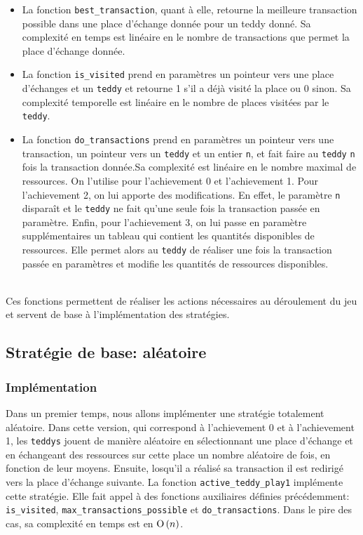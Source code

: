 \documentclass[12pt]{article}
\begin{document}
\begin{itemize}
        \item La fonction \texttt{best\_transaction}, quant à elle, retourne la meilleure transaction possible dans une place d'échange donnée pour un teddy donné. Sa complexité en temps est linéaire en le nombre de transactions que permet la place d'échange donnée.\\
        
        \item La fonction \texttt{is\_visited} prend en paramètres un pointeur vers une place d'échanges et un \texttt{teddy} et retourne 1 s'il a déjà visité la place ou 0 sinon. Sa complexité temporelle est linéaire en le nombre de places visitées par le \texttt{teddy}.\\
        
        \item La fonction \texttt{do\_transactions} prend en paramètres un pointeur vers une transaction, un pointeur vers un \texttt{teddy} et un entier \texttt{n}, et fait faire au \texttt{teddy} \texttt{n} fois la transaction donnée.Sa complexité est linéaire en le nombre maximal de ressources. On l'utilise pour l'achievement 0 et l'achievement 1. Pour l'achievement 2, on lui apporte des modifications. En effet, le paramètre \texttt{n} disparaît et le \texttt{teddy} ne fait qu'une seule fois la transaction passée en paramètre. Enfin, pour l'achievement 3, on lui passe en paramètre supplémentaires un tableau qui contient les quantités disponibles de ressources. Elle permet alors au \texttt{teddy} de réaliser une fois la transaction passée en paramètres et modifie les quantités de ressources disponibles.
        \end{itemize}\\
        
        Ces fonctions permettent de réaliser les actions nécessaires au déroulement du jeu et servent de base à l'implémentation des stratégies. 
        \subsection{Stratégie de base: aléatoire}
        \subsubsection{Implémentation}
        Dans un premier temps, nous allons implémenter une stratégie totalement aléatoire. Dans cette version, qui correspond à l'achievement 0 et à l'achievement 1, les \texttt{teddys} jouent de manière aléatoire en sélectionnant une place d'échange et en échangeant des ressources sur cette place un nombre aléatoire de fois, en fonction de leur moyens. Ensuite, losqu'il a réalisé sa transaction il est redirigé vers la place d'échange suivante. 
        La fonction \texttt{active\_teddy\_play1} implémente cette stratégie. Elle fait appel à des fonctions auxiliaires définies précédemment: \texttt{is\_visited}, \texttt{max\_transactions\_possible} et \texttt{do\_transactions}. Dans le pire des cas, sa complexité en temps est en ${\text{O}}\left(n\right)$. 
\end{document}
